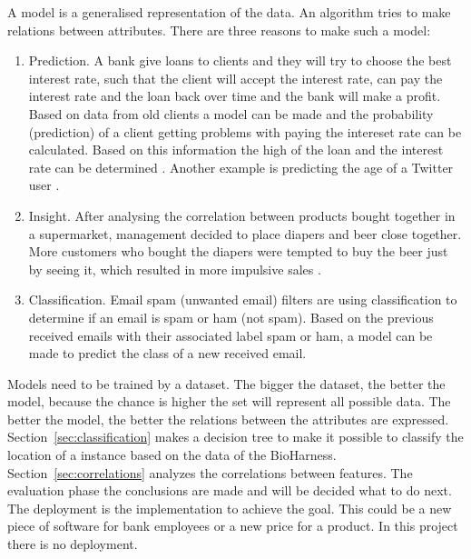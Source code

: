 	A model is a generalised representation of the data. An algorithm tries to make relations between attributes. There are three reasons to make such a model:
	\begin{enumerate}
		\item Prediction. A bank give loans to clients and they will try to choose the best interest rate, such that the client will accept the interest rate, can pay the interest rate and the loan back over time and the bank will make a profit. Based on data from old clients a model can be made and the probability (prediction) of a client getting problems with paying the intereset rate can be calculated. Based on this information the high of the loan and the interest rate can be determined \cite{credit}. Another example is predicting the age of a Twitter user \cite{tweetgenie}.		
		\item Insight. After analysing the correlation between products bought together in a supermarket, management decided to place diapers and beer close together. More customers who bought the diapers were tempted to buy the beer just by seeing it, which resulted in more impulsive sales \cite{beer}.
		\item Classification. Email spam (unwanted email) filters are using classification to determine if an email is spam or ham (not spam). Based on the previous received emails with their associated label spam or ham, a model can be made to predict the class of a new received email. 
	\end{enumerate}
	Models need to be trained by a dataset. The bigger the dataset, the better the model, because the chance is higher the set will represent all possible data. The better the model, the better the relations between the attributes are expressed. Section~\ref{sec:classification} makes a decision tree to make it possible to classify the location of a instance based on the data of the BioHarness. Section~\ref{sec:correlations} analyzes the correlations between features. The evaluation phase the conclusions are made and will be decided what to do next. The deployment is the implementation to achieve the goal. This could be a new piece of software for bank employees or a new price for a product. In this project there is no deployment.


